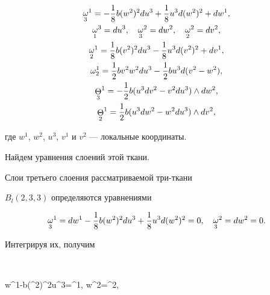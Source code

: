 \begin{gather*}


{\crazy{\omega}{3}}^{1}=


-\dfrac{1}{8}b(w^{2})^{2}du^{3}+


\dfrac{1}{8}u^{3}d(w^{2})^{2}+dw^{1},\\


%


{\crazy{\omega}{1}}^{3}=du^{3}, \quad {\crazy{\omega}{3}}^{2}=dw^{2},


\quad  {\crazy{\omega}{2}}^{2}=dv^{2},\\


%


{\crazy{\omega}{2}}^{1}=\dfrac{1}{8}b(v^{2})^{2}du^{3}-


\dfrac{1}{8}u^{3}d(v^{2})^{2}+dv^{1},\\


%


\omega^{1}_{2}=\dfrac{1}{2}bv^{2}w^{2}du^{3}-\dfrac{1}{2}bu^{3}d(v^{2}-w^{2}),\\


%


{\crazy{\Theta}{3}}^{1}=-\dfrac{1}{2}b(u^{3}dv^{2}-v^{2}du^{3})\wedge dw^{2},\\


%


{\crazy{\Theta}{2}}^{1}=\dfrac{1}{2}b(u^{3}dw^{2}-w^{2}du^{3})\wedge dv^{2},


\end{gather*}


где $w^{1}$, $w^{2}$, $u^{3}$, $v^{1}$ и $v^{2}$ --- локальные координаты.





Найдем уравнения слоений этой ткани.


Слои третьего слоения рассматриваемой три-ткани


$B_{l}(2,3,3)$ определяются уравнениями


$$


{\crazy{\omega}{3}}^{1}=


dw^{1}-\dfrac{1}{8}b(w^{2})^{2}du^{3}+


\dfrac{1}{8}u^{3}d(w^{2})^{2}=0,\quad


{\crazy{\omega}{3}}^{2}=dw^{2}=0.


$$


Интегрируя их, получим


$$


w^{1}-b(^{2})^{2}u^{3}=^{1}, \quad w^{2}=^{2},


